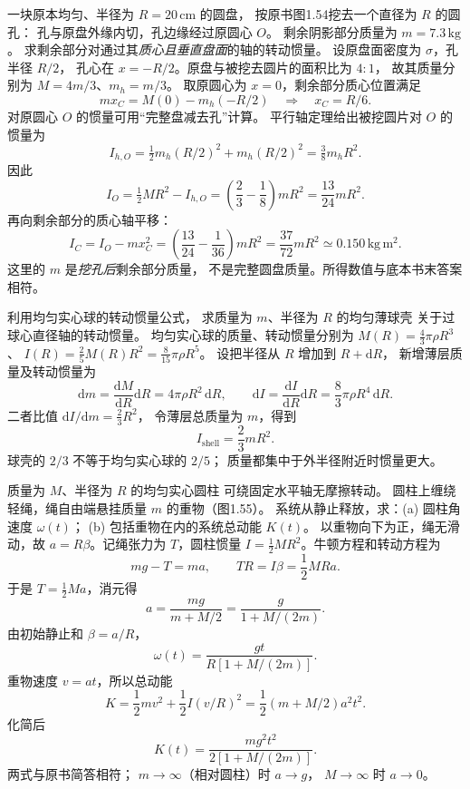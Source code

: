 
一块原本均匀、半径为 $R=20\,\mathrm{cm}$ 的圆盘，
按原书图1.54挖去一个直径为 $R$ 的圆孔：
孔与原盘外缘内切，孔边缘经过原圆心 $O$。
剩余阴影部分质量为 $m=7.3\,\mathrm{kg}$。
求剩余部分对通过其\emph{质心且垂直盘面}的轴的转动惯量。
\exsolution
设原盘面密度为 $\sigma$，孔半径 $R/2$，
孔心在 $x=-R/2$。原盘与被挖去圆片的面积比为 $4:1$，
故其质量分别为 $M=4m/3$、$m_h=m/3$。
取原圆心为 $x=0$，剩余部分质心位置满足
\[
mx_C=M(0)-m_h(-R/2)
\quad\Longrightarrow\quad
\boxed{x_C=R/6}.
\]
对原圆心 $O$ 的惯量可用“完整盘减去孔”计算。
平行轴定理给出被挖圆片对 $O$ 的惯量为
\[
I_{h,O}=\tfrac12m_h(R/2)^2+m_h(R/2)^2
=\tfrac38m_h R^2.
\]
因此
\[
I_O=\tfrac12MR^2-I_{h,O}
=\left(\frac23-\frac18\right)mR^2
=\frac{13}{24}mR^2.
\]
再向剩余部分的质心轴平移：
\[
\boxed{I_C=I_O-mx_C^2
=\left(\frac{13}{24}-\frac1{36}\right)mR^2
=\frac{37}{72}mR^2
\simeq0.150\,\mathrm{kg\,m^2}.}
\]
\excheck 这里的 $m$ 是\emph{挖孔后}剩余部分质量，
不是完整圆盘质量。所得数值与底本书末答案相符。

利用均匀实心球的转动惯量公式，
求质量为 $m$、半径为 $R$ 的均匀薄球壳
关于过球心直径轴的转动惯量。
\exsolution
均匀实心球的质量、转动惯量分别为
$M(R)=\frac43\pi\rho R^3$、
$I(R)=\frac25M(R)R^2=\frac8{15}\pi\rho R^5$。
设把半径从 $R$ 增加到 $R+\mathrm dR$，
新增薄层质量及转动惯量为
\[
\mathrm dm=\frac{\mathrm dM}{\mathrm dR}\mathrm dR
=4\pi\rho R^2\,\mathrm dR,\qquad
\mathrm dI=\frac{\mathrm dI}{\mathrm dR}\mathrm dR
=\frac83\pi\rho R^4\,\mathrm dR.
\]
二者比值
$\mathrm dI/\mathrm dm=\frac23R^2$，
令薄层总质量为 $m$，得到
\[
\boxed{I_{\mathrm{shell}}=\frac23mR^2}.
\]
\excheck 球壳的 $2/3$ 不等于均匀实心球的 $2/5$；
质量都集中于外半径附近时惯量更大。

质量为 $M$、半径为 $R$ 的均匀实心圆柱
可绕固定水平轴无摩擦转动。
圆柱上缠绕轻绳，绳自由端悬挂质量 $m$ 的重物（图1.55）。
系统从静止释放，求：(a) 圆柱角速度 $\omega(t)$；
(b) 包括重物在内的系统总动能 $K(t)$。
\exsolution
以重物向下为正，绳无滑动，故
$a=R\beta$。记绳张力为 $T$，圆柱惯量
$I=\frac12MR^2$。牛顿方程和转动方程为
\[
mg-T=ma,\qquad TR=I\beta=\frac12MRa.
\]
于是 $T=\frac12Ma$，消元得
\[
a=\frac{mg}{m+M/2}=\frac{g}{1+M/(2m)}.
\]
由初始静止和 $\beta=a/R$，
\[
\boxed{\omega(t)=\frac{gt}{R[1+M/(2m)]}}.
\]
重物速度 $v=at$，所以总动能
\[
K=\frac12mv^2+\frac12I(v/R)^2
=\frac12(m+M/2)a^2t^2.
\]
化简后
\[
\boxed{K(t)=\frac{mg^2t^2}{2[1+M/(2m)]}}.
\]
\excheck 两式与原书简答相符；
$m\to\infty$（相对圆柱）时 $a\to g$，
$M\to\infty$ 时 $a\to0$。

